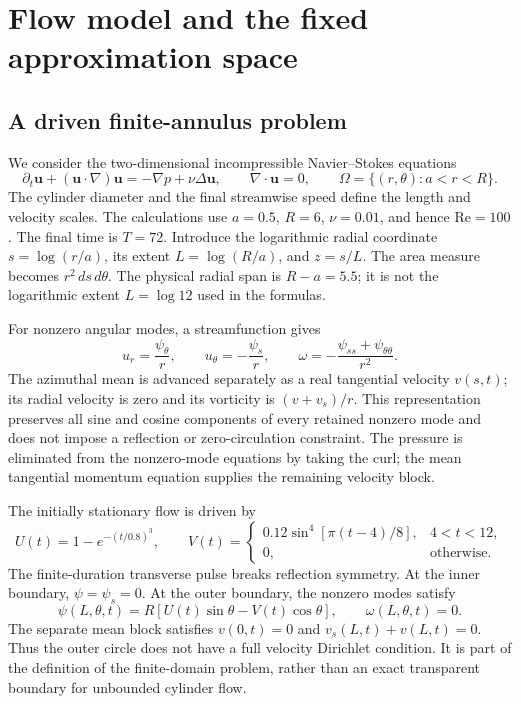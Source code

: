 \section{Flow model and the fixed approximation space}
\label{sec:governing-equations}
\label{sec:space-discretization}

\subsection{A driven finite-annulus problem}

We consider the two-dimensional incompressible Navier--Stokes equations
\begin{equation}
 \partial_t\boldsymbol u+(\boldsymbol u\cdot\nabla)\boldsymbol u
 =-\nabla p+\nu\Delta\boldsymbol u,\qquad
 \nabla\cdot\boldsymbol u=0,\qquad
 \Omega=\{(r,\theta):a<r<R\}.
 \label{eq:ns}
\end{equation}
The cylinder diameter and the final streamwise speed define the length
and velocity scales. The calculations use \(a=0.5\), \(R=6\),
\(\nu=0.01\), and hence \(\mathrm{Re}=100\). The final time is
\(T=72\). Introduce the logarithmic radial coordinate
\(s=\log(r/a)\), its extent \(L=\log(R/a)\), and \(z=s/L\).
The area measure becomes \(r^2\,ds\,d\theta\). The physical radial span is $R-a=5.5$; it is not the logarithmic extent $L=\log12$ used in the formulas.

For nonzero angular modes, a streamfunction gives
\begin{equation}
 u_r=\frac{\psi_\theta}{r},\qquad
 u_\theta=-\frac{\psi_s}{r},\qquad
 \omega=-\frac{\psi_{ss}+\psi_{\theta\theta}}{r^2}.
 \label{eq:kinematics}
\end{equation}
The azimuthal mean is advanced separately as a real tangential velocity
\(v(s,t)\); its radial velocity is zero and its vorticity is
\((v+v_s)/r\). This representation preserves all sine and cosine
components of every retained nonzero mode and does not impose a
reflection or zero-circulation constraint. The pressure is eliminated
from the nonzero-mode equations by taking the curl; the mean tangential
momentum equation supplies the remaining velocity block.

The initially stationary flow is driven by
\begin{equation}
 U(t)=1-e^{-(t/0.8)^3},\qquad
 V(t)=\begin{cases}
 0.12\sin^4[\pi(t-4)/8],&4<t<12,\\
 0,&\text{otherwise}.
 \end{cases}
 \label{eq:driving}
\end{equation}
The finite-duration transverse pulse breaks reflection symmetry. At
the inner boundary, \(\psi=\psi_s=0\). At the outer boundary, the
nonzero modes satisfy
\begin{equation}
 \psi(L,\theta,t)=R[U(t)\sin\theta-V(t)\cos\theta],\qquad
 \omega(L,\theta,t)=0.
 \label{eq:outer-boundary}
\end{equation}
The separate mean block satisfies \(v(0,t)=0\) and
\(v_s(L,t)+v(L,t)=0\). Thus the outer circle does not have a full
velocity Dirichlet condition. It is part of the definition of the
finite-domain problem, rather than an exact transparent boundary for
unbounded cylinder flow.

